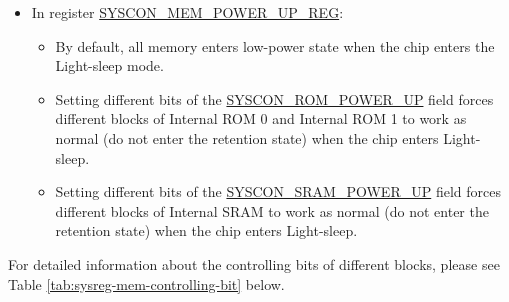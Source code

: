 \documentclass[main\_\_EN.tex]{subfiles}
\begin{document}
\begin{itemize}
\begin{itemize}
    \end{itemize}
    \item In register \hyperref[regdescSYSCONMEMPOWERUPREG]{SYSCON\_MEM\_POWER\_UP\_REG}:
    \begin{itemize}
        \item By default, all memory enters low-power state when the chip enters the Light-sleep mode.
        \item Setting different bits of the \hyperref[fielddescSYSCONROMPOWERUP]{SYSCON\_ROM\_POWER\_UP} field forces different blocks of Internal ROM 0 and Internal ROM 1 to work as normal (do not enter the retention state) when the chip enters Light-sleep.
        \item Setting different bits of the \hyperref[fielddescSYSCONSRAMPOWERUP]{SYSCON\_SRAM\_POWER\_UP} field forces different blocks of Internal SRAM to work as normal (do not enter the retention state) when the chip enters Light-sleep.
    \end{itemize}
\end{itemize}

For detailed information about the controlling bits of different blocks, please see Table \ref{tab:sysreg-mem-controlling-bit} below.
\end{document}
